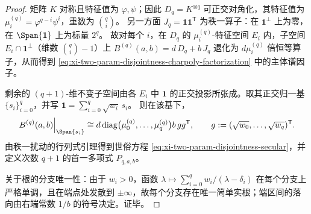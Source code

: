 \begin{proof}
矩阵 \(K\) 对称且特征值为 \(\varphi,\psi\)；因此 \(D_q=K^{\otimes q}\) 可正交对角化，其特征值为 \(\mu_i^{(q)}=\varphi^{q-i}\psi^{i}\)，重数为 \(\binom{q}{i}\)。
另一方面 \(J_q=\mathbf 1\mathbf 1^{\mathsf T}\) 为秩一算子：在 \(\mathbf 1^\perp\) 上为零，在 \(\Span\{\mathbf 1\}\) 上为标量 \(2^q\)。
故对每个 \(i\)，在 \(D_q\) 的 \(\mu_i^{(q)}\)-特征空间 \(E_i\) 内，子空间 \(E_i\cap \mathbf 1^\perp\)（维数 \(\binom{q}{i}-1\)）上
\(
B^{(q)}(a,b)=d\,D_q+b\,J_q
\)
退化为 \(d\mu_i^{(q)}\) 倍恒等算子，从而得到 \eqref{eq:xi-two-param-disjointness-charpoly-factorization} 中的主体谱因子。
\par
剩余的 \((q+1)\)-维不变子空间由各 \(E_i\) 中 \(\mathbf 1\) 的正交投影所张成。取其正交归一基 \(\{s_i\}_{i=0}^q\)，并写
\(
\mathbf 1=\sum_{i=0}^q \sqrt{w_i}\,s_i
\)。
则在该基下，
\[
\left.B^{(q)}(a,b)\right|_{\Span\{s_i\}}
\cong
d\,\mathrm{diag}\bigl(\mu_0^{(q)},\dots,\mu_q^{(q)}\bigr)
b\,gg^{\mathsf T},
\qquad
g:=(\sqrt{w_0},\dots,\sqrt{w_q})^{\mathsf T}.
\]
由秩一扰动的行列式引理得到世俗方程 \eqref{eq:xi-two-param-disjointness-secular}，并定义次数 \(q+1\) 的首一多项式 \(P_{q,a,b}\)。
\par
关于根的分支唯一性：由于 \(w_i>0\)，函数
\(
\lambda\mapsto \sum_{i=0}^q w_i/(\lambda-\delta_i)
\)
在每个分支上严格单调，且在端点处发散到 \(\pm\infty\)，故每个分支存在唯一简单实根；端区间的落向由右端常数 \(1/b\) 的符号决定。证毕。
\end{proof}

